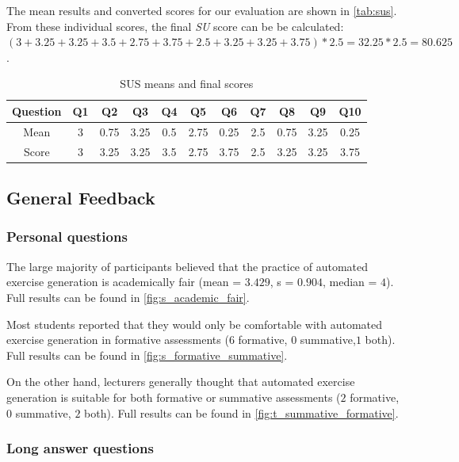 \documentclass{l4proj}
\begin{document}
The mean results and converted scores for our evaluation are shown in \autoref{tab:sus}. From these individual scores, the final \emph{SU} score can be be calculated: $(3 + 3.25 + 3.25 + 3.5 + 2.75 + 3.75 + 2.5 + 3.25 + 3.25 + 3.75) * 2.5 = 32.25 * 2.5 = 80.625$.

\begin{table}[!h]
\begin{center}
\begin{tabular}{| c || c | c | c | c | c | c | c | c | c | c |}
	\hline
	Question & Q1 & Q2 & Q3 & Q4 & Q5 & Q6 & Q7 & Q8 & Q9 & Q10 \\
	\hline
	\hline
	Mean & 3 & 0.75 & 3.25 & 0.5 & 2.75 & 0.25 & 2.5 & 0.75 & 3.25 & 0.25 \\
	\hline
	Score & 3 & 3.25 & 3.25 & 3.5 & 2.75 & 3.75 & 2.5 & 3.25 & 3.25 & 3.75 \\
	\hline
\end{tabular}
\caption{\label{tab:sus}SUS means and final scores}
\end{center}
\end{table}

\subsection{General Feedback}

\subsubsection{Personal questions}
\label{sec:personal_questions}

The large majority of participants believed that the practice of automated exercise generation is academically fair (mean = $3.429$, s = $0.904$, median = $4$). Full results can be found in \autoref{fig:s_academic_fair}.

Most students reported that they would only be comfortable with automated exercise generation in formative assessments ($6$ formative, $0$ summative,$1$ both).  Full results can be found in \autoref{fig:s_formative_summative}.

On the other hand, lecturers generally thought that automated exercise generation is suitable for both formative or summative assessments ($2$ formative, $0$ summative, $2$ both).  Full results can be found in \autoref{fig:t_summative_formative}.

\subsubsection{Long answer questions}
\end{document}
